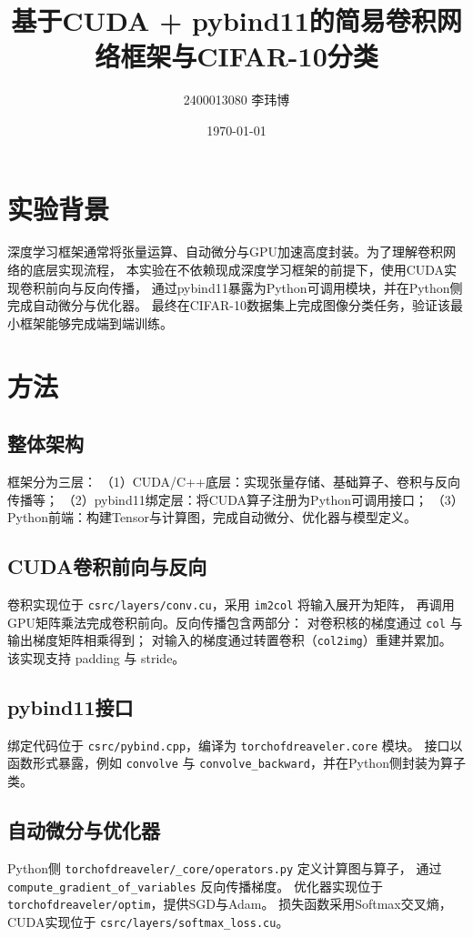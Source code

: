 \documentclass[UTF8]{article}
\title{基于CUDA + pybind11的简易卷积网络框架与CIFAR-10分类}
\author{2400013080 李玮博}
\date{\today}
\begin{document}
\maketitle

\section{实验背景}
深度学习框架通常将张量运算、自动微分与GPU加速高度封装。为了理解卷积网络的底层实现流程，
本实验在不依赖现成深度学习框架的前提下，使用CUDA实现卷积前向与反向传播，
通过pybind11暴露为Python可调用模块，并在Python侧完成自动微分与优化器。
最终在CIFAR-10数据集上完成图像分类任务，验证该最小框架能够完成端到端训练。

\section{方法}
\subsection{整体架构}
框架分为三层：
（1）CUDA/C++底层：实现张量存储、基础算子、卷积与反向传播等；
（2）pybind11绑定层：将CUDA算子注册为Python可调用接口；
（3）Python前端：构建Tensor与计算图，完成自动微分、优化器与模型定义。

\subsection{CUDA卷积前向与反向}
卷积实现位于 \texttt{csrc/layers/conv.cu}，采用 \texttt{im2col} 将输入展开为矩阵，
再调用GPU矩阵乘法完成卷积前向。反向传播包含两部分：
对卷积核的梯度通过 \texttt{col} 与输出梯度矩阵相乘得到；
对输入的梯度通过转置卷积（\texttt{col2img}）重建并累加。
该实现支持 padding 与 stride。

\subsection{pybind11接口}
绑定代码位于 \texttt{csrc/pybind.cpp}，编译为 \texttt{torchofdreaveler.core} 模块。
接口以函数形式暴露，例如 \texttt{convolve} 与 \texttt{convolve\_backward}，并在Python侧封装为算子类。

\subsection{自动微分与优化器}
Python侧 \texttt{torchofdreaveler/\_core/operators.py} 定义计算图与算子，
通过 \texttt{compute\_gradient\_of\_variables} 反向传播梯度。
优化器实现位于 \texttt{torchofdreaveler/optim}，提供SGD与Adam。
损失函数采用Softmax交叉熵，CUDA实现位于 \texttt{csrc/layers/softmax\_loss.cu}。
\end{document}
